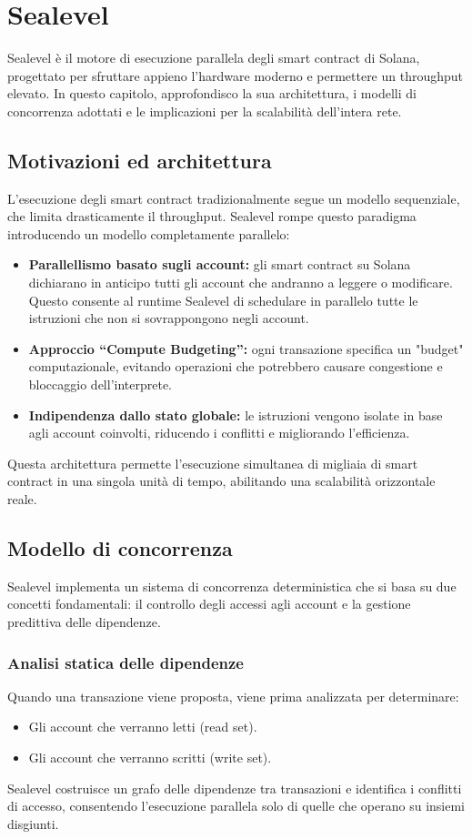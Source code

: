 \documentclass[a4paper,12pt]{report}
\begin{document}
	\section{Sealevel}
	Sealevel è il motore di esecuzione parallela degli smart contract di Solana, progettato per sfruttare appieno l’hardware moderno e permettere un throughput elevato. In questo capitolo, approfondisco la sua architettura, i modelli di concorrenza adottati e le implicazioni per la scalabilità dell’intera rete.
	
	\subsection{Motivazioni ed architettura}
	L’esecuzione degli smart contract tradizionalmente segue un modello sequenziale, che limita drasticamente il throughput. Sealevel rompe questo paradigma introducendo un modello completamente parallelo:
	\begin{itemize}
		\item \textbf{Parallellismo basato sugli account:} gli smart contract su Solana dichiarano in anticipo tutti gli account che andranno a leggere o modificare. Questo consente al runtime Sealevel di schedulare in parallelo tutte le istruzioni che non si sovrappongono negli account.
		\item \textbf{Approccio “Compute Budgeting”:} ogni transazione specifica un "budget" computazionale, evitando operazioni che potrebbero causare congestione e bloccaggio dell’interprete.
		\item \textbf{Indipendenza dallo stato globale:} le istruzioni vengono isolate in base agli account coinvolti, riducendo i conflitti e migliorando l'efficienza.
	\end{itemize}
	Questa architettura permette l’esecuzione simultanea di migliaia di smart contract in una singola unità di tempo, abilitando una scalabilità orizzontale reale.
	
	\subsection{Modello di concorrenza}
	Sealevel implementa un sistema di concorrenza deterministica che si basa su due concetti fondamentali: il controllo degli accessi agli account e la gestione predittiva delle dipendenze.
	
	\subsubsection{Analisi statica delle dipendenze}
	Quando una transazione viene proposta, viene prima analizzata per determinare:
	\begin{itemize}
		\item Gli account che verranno letti (read set).
		\item Gli account che verranno scritti (write set).
	\end{itemize}
	Sealevel costruisce un grafo delle dipendenze tra transazioni e identifica i conflitti di accesso, consentendo l’esecuzione parallela solo di quelle che operano su insiemi disgiunti.
	
\end{document}
